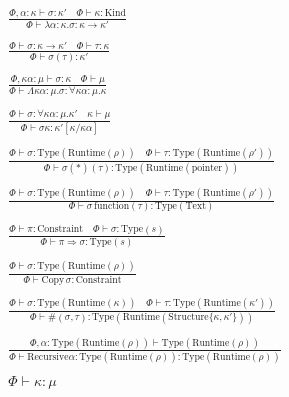 \documentclass {article}
\begin{document}
\begin{gather*}
\frac
{\Phi, \alpha : \kappa \vdash \sigma : \kappa' \quad \Phi \vdash \kappa : \text{Kind}} 
{\Phi \vdash \lambda \alpha : \kappa. \sigma : \kappa \to \kappa' } \\
\\
\frac
{\Phi \vdash \sigma : \kappa \to \kappa' \quad \Phi \vdash \tau : \kappa}
{\Phi \vdash \sigma (\tau) : \kappa' } \\
\\
\frac
{\Phi, \kappa \alpha : \mu \vdash \sigma : \kappa \quad \Phi \vdash \mu}
{\Phi \vdash \Lambda \kappa \alpha : \mu. \sigma : \forall \kappa \alpha : \mu. \kappa} \\
\\
\frac
{\Phi \vdash \sigma : \forall \kappa \alpha : \mu. \kappa' \quad \kappa \vdash \mu}
{\Phi \vdash \sigma \kappa : \kappa'[\kappa / \kappa \alpha]} \\
\\
\frac
{\Phi \vdash \sigma : \text{Type} (\text{Runtime} (\rho)) \quad \Phi \vdash \tau : \text{Type} (\text{Runtime} (\rho'))}
{\Phi \vdash \sigma (*) (\tau) : \text{Type} (\text{Runtime} (\text{pointer}))} \\
\\
\frac
{\Phi \vdash \sigma : \text{Type} (\text{Runtime} (\rho)) \quad \Phi \vdash \tau : \text{Type} (\text{Runtime} (\rho'))}
{\Phi \vdash \sigma \, \text{function} (\tau) : \text{Type} (\text{Text})} \\
\\
\frac
{\Phi \vdash \pi : \text{Constraint} \quad \Phi \vdash \sigma : \text{Type}(s)}
{\Phi \vdash \pi \Rightarrow \sigma : \text{Type}(s)} \\
\\
\frac
{\Phi \vdash \sigma : \text{Type}(\text{Runtime}(\rho))}
{\Phi \vdash \text{Copy} \, \sigma : \text{Constraint}} \\
\\
\frac
{\Phi \vdash \sigma : \text{Type}(\text{Runtime}(\kappa)) \quad \Phi \vdash \tau : \text{Type} (\text{Runtime}(\kappa')) }
{\Phi \vdash \#(\sigma, \tau) : \text{Type} (\text{Runtime} (\text{Structure} \{ \kappa,\kappa'\} ))} \\
\\
\frac
{\Phi, \alpha : \text{Type} (\text{Runtime} (\rho)) \vdash \text{Type} (\text{Runtime} (\rho)) }
{\Phi \vdash \text{Recursive} \alpha : \text{Type} (\text{Runtime} (\rho)) : \text{Type} (\text{Runtime} (\rho))  } \\
\\
\Phi \vdash \kappa : \mu \tag*{[Kind Validation]} \\

\end{gather*}
\end{document}
